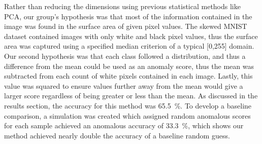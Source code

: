 Rather than reducing the dimensions using previous statistical methods like PCA, our group’s hypothesis
was that most of the information contained in the image was found in the surface area of given pixel
values. The skewed MNIST dataset contained images with only white and black pixel values, thus the
surface area was captured using a specified median criterion of a typical [0,255] domain.
Our second hypothesis was that each class followed a distribution, and thus a difference from the mean
could be used as an anomaly score, thus the mean was subtracted from each count of white pixels
contained in each image. Lastly, this value was squared to ensure values further away from the mean
would give a larger score regardless of being greater or less than the mean.
As discussed in the results section, the accuracy for this method was 65.5~\%. To develop a baseline
comparison, a simulation was created which assigned random anomalous scores for each sample
achieved an anomalous accuracy of 33.3~\%, which shows our method achieved nearly double the
accuracy of a baseline random guess.